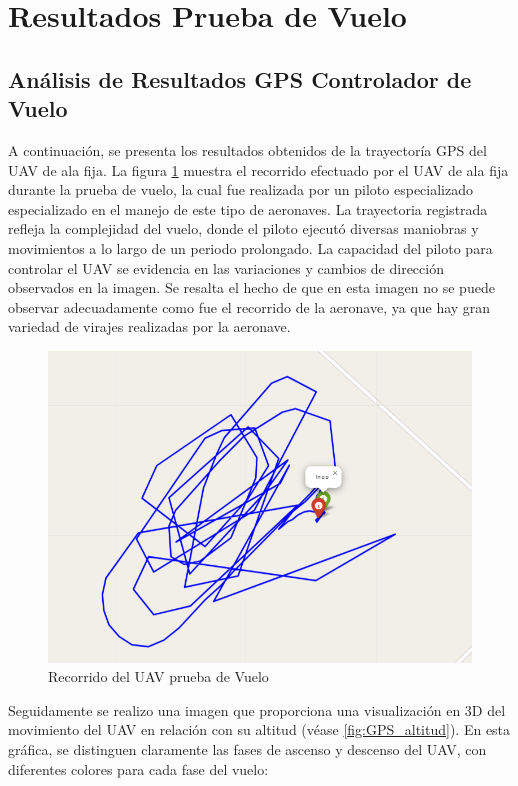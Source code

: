 \section{Resultados Prueba de Vuelo}
    \subsection{Análisis de Resultados GPS Controlador de Vuelo}

        A continuación, se presenta los resultados obtenidos de la trayectoría GPS del UAV de ala fija. La figura \ref{fig:GPS_pruebaVuelo} muestra el recorrido efectuado por el UAV de ala fija durante la prueba de vuelo, la cual fue realizada por un piloto especializado especializado en el manejo de este tipo de aeronaves. La trayectoria registrada refleja la complejidad del vuelo, donde el piloto ejecutó diversas maniobras y movimientos a lo largo de un periodo prolongado. La capacidad del piloto para controlar el UAV se evidencia en las variaciones y cambios de dirección observados en la imagen. Se resalta el hecho de que en esta imagen no se puede observar adecuadamente como fue el recorrido de la aeronave, ya que hay gran variedad de virajes realizadas por la aeronave. 
        \begin{figure}[H]
            \centering
            \includegraphics[width=12 cm]{Imagenes/Vuelo/gps_Prueba.png}
            \caption{Recorrido del UAV prueba de Vuelo}
            \label{fig:GPS_pruebaVuelo}
        \end{figure}

        Seguidamente se realizo una imagen que proporciona una visualización en 3D del movimiento del UAV en relación con su altitud (véase \ref{fig:GPS_altitud}). En esta gráfica, se distinguen claramente las fases de ascenso y descenso del UAV, con diferentes colores para cada fase del vuelo: \\

